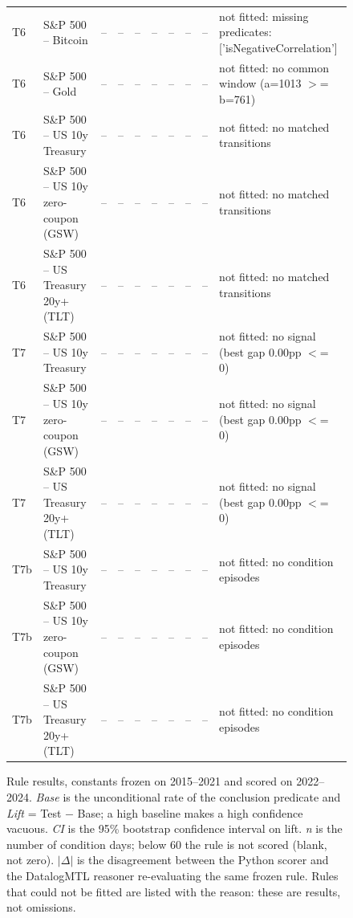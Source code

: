 \begin{figure}
\begin{tabular}{lllrrrrrrl}
T6 & S\&P 500 -- Bitcoin & -- & -- & -- & -- & -- & -- & -- & not fitted: missing predicates: ['isNegativeCorrelation'] \\
T6 & S\&P 500 -- Gold & -- & -- & -- & -- & -- & -- & -- & not fitted: no common window (a=1013 $>$= b=761) \\
T6 & S\&P 500 -- US 10y Treasury & -- & -- & -- & -- & -- & -- & -- & not fitted: no matched transitions \\
T6 & S\&P 500 -- US 10y zero-coupon (GSW) & -- & -- & -- & -- & -- & -- & -- & not fitted: no matched transitions \\
T6 & S\&P 500 -- US Treasury 20y+ (TLT) & -- & -- & -- & -- & -- & -- & -- & not fitted: no matched transitions \\
T7 & S\&P 500 -- US 10y Treasury & -- & -- & -- & -- & -- & -- & -- & not fitted: no signal (best gap 0.00pp $<$= 0) \\
T7 & S\&P 500 -- US 10y zero-coupon (GSW) & -- & -- & -- & -- & -- & -- & -- & not fitted: no signal (best gap 0.00pp $<$= 0) \\
T7 & S\&P 500 -- US Treasury 20y+ (TLT) & -- & -- & -- & -- & -- & -- & -- & not fitted: no signal (best gap 0.00pp $<$= 0) \\
T7b & S\&P 500 -- US 10y Treasury & -- & -- & -- & -- & -- & -- & -- & not fitted: no condition episodes \\
T7b & S\&P 500 -- US 10y zero-coupon (GSW) & -- & -- & -- & -- & -- & -- & -- & not fitted: no condition episodes \\
T7b & S\&P 500 -- US Treasury 20y+ (TLT) & -- & -- & -- & -- & -- & -- & -- & not fitted: no condition episodes \\
\bottomrule
\end{tabular}
\caption{Rule results, constants frozen on 2015--2021 and scored on 2022--2024. \emph{Base} is the unconditional rate of the conclusion predicate and \emph{Lift} = Test $-$ Base; a high baseline makes a high confidence vacuous. \emph{CI} is the 95\% bootstrap confidence interval on lift. \emph{n} is the number of condition days; below 60 the rule is not scored (blank, not zero). $|\Delta|$ is the disagreement between the Python scorer and the DatalogMTL reasoner re-evaluating the same frozen rule. Rules that could not be fitted are listed with the reason: these are results, not omissions.}
\label{tab:rule-results_classifier}
\end{figure}
